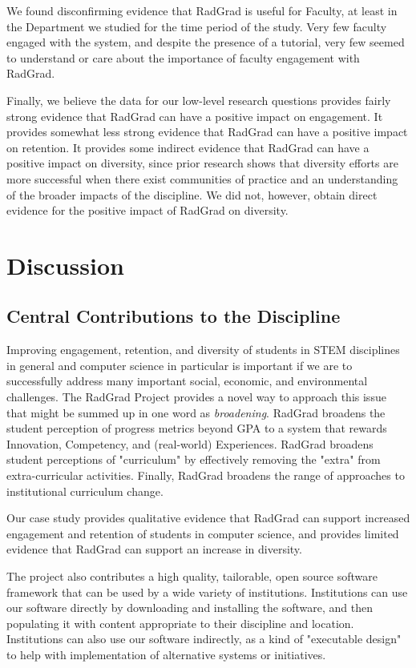 \documentclass[acmsmall,nonacm]{acmart}
\begin{document}
We found disconfirming evidence that RadGrad is useful for Faculty, at least in the Department we studied for the time period of the study. Very few faculty engaged with the system, and despite the presence of a tutorial, very few seemed to understand or care about the importance of faculty engagement with RadGrad.

Finally, we believe the data for our low-level research questions provides fairly strong evidence that RadGrad can have a positive impact on engagement.  It provides somewhat less strong evidence that RadGrad can have a positive impact on retention.  It provides some indirect evidence that RadGrad can have a positive impact on diversity, since prior research shows that diversity efforts are more successful when there exist communities of practice and an understanding of the broader impacts of the discipline. We did not, however, obtain direct evidence for the positive impact of RadGrad on diversity.

\section{Discussion}

\subsection{Central Contributions to the Discipline}

Improving engagement, retention, and diversity of students in STEM disciplines in general and computer science in particular is important if we are to successfully address many important social, economic, and environmental challenges. The RadGrad Project provides a novel way to approach this issue that might be summed up in one word as {\em broadening}.  RadGrad broadens the student perception of progress metrics beyond GPA to a system that rewards Innovation, Competency, and (real-world) Experiences.  RadGrad broadens student perceptions of "curriculum" by effectively removing the "extra" from extra-curricular activities.  Finally, RadGrad broadens the range of approaches to institutional curriculum change.

Our case study provides qualitative evidence that RadGrad can support increased engagement and retention of students in computer science, and provides limited evidence that RadGrad can support an increase in diversity.

The project also contributes a high quality, tailorable, open source software framework that can be used by a wide variety of institutions. Institutions can use our software directly by downloading and installing the software, and then populating it with content appropriate to their discipline and location.  Institutions can also use our software indirectly, as a kind of "executable design" to help with implementation of alternative systems or initiatives.
\end{document}
